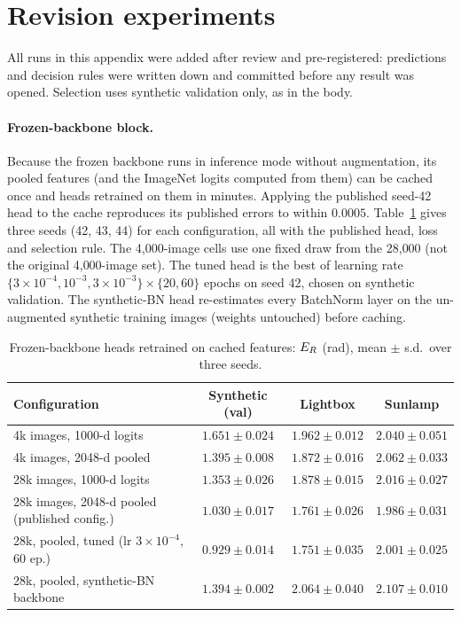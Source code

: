 \section{Revision experiments}
\label{app:revision}

All runs in this appendix were added after review and pre-registered: predictions and
decision rules were written down and committed before any result was opened. Selection
uses synthetic validation only, as in the body.

\paragraph{Frozen-backbone block.} Because the frozen backbone runs in inference mode
without augmentation, its pooled features (and the ImageNet logits computed from them)
can be cached once and heads retrained on them in minutes. Applying the published
seed-42 head to the cache reproduces its published errors to within $0.0005$.
Table~\ref{tab:frozen} gives three seeds (42, 43, 44) for each configuration, all with
the published head, loss and selection rule. The 4{,}000-image cells use one fixed
draw from the 28{,}000 (not the original 4{,}000-image set). The tuned head is the best
of learning rate $\{3{\times}10^{-4}, 10^{-3}, 3{\times}10^{-3}\}\times\{20, 60\}$
epochs on seed 42, chosen on synthetic validation. The synthetic-BN head re-estimates
every BatchNorm layer on the un-augmented synthetic training images (weights
untouched) before caching.

\begin{table}[ht]
  \caption{Frozen-backbone heads retrained on cached features: $E_{R}$ (rad), mean
  $\pm$ s.d.\ over three seeds.}
  \label{tab:frozen}
  \centering
  \small
  \begin{tabular}{l ccc}
    \toprule
    Configuration & Synthetic (val) & Lightbox & Sunlamp \\
    \midrule
    4k images, 1000-d logits & $1.651{\pm}0.024$ & $1.962{\pm}0.012$ & $2.040{\pm}0.051$ \\
    4k images, 2048-d pooled & $1.395{\pm}0.008$ & $1.872{\pm}0.016$ & $2.062{\pm}0.033$ \\
    28k images, 1000-d logits & $1.353{\pm}0.026$ & $1.878{\pm}0.015$ & $2.016{\pm}0.027$ \\
    28k images, 2048-d pooled (published config.) & $1.030{\pm}0.017$ & $1.761{\pm}0.026$ & $1.986{\pm}0.031$ \\
    28k, pooled, tuned (lr $3{\times}10^{-4}$, 60 ep.) & $0.929{\pm}0.014$ & $1.751{\pm}0.035$ & $2.001{\pm}0.025$ \\
    28k, pooled, synthetic-BN backbone & $1.394{\pm}0.002$ & $2.064{\pm}0.040$ & $2.107{\pm}0.010$ \\
    \bottomrule
  \end{tabular}
\end{table}

